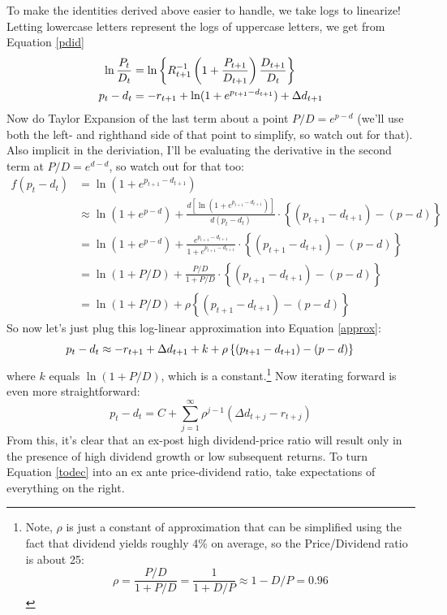 \documentclass[12pt]{article}
\theoremstyle{plain}
\theoremstyle{definition}
\theoremstyle{remark}
\begin{document}
To make the identities derived above easier to handle, we take
logs to linearize!
Letting lowercase letters represent the logs of uppercase letters, we
get from Equation \ref{pdid}
\begin{align}
    \ln \frac{P_t}{D_t} &=
	\ln \left\{ R^{-1}_{t+1} \left( 1 + \frac{P_{t+1}}{D_{t+1}}\right) \frac{D_{t+1}}{D_t}
	\right\} \notag \\
	p_t - d_t &= -r_{t+1} + \ln( 1 + e^{p_{t+1} - d_{t+1}})
	+ \Delta d_{t+1} \label{approx}
\end{align}
Now do Taylor Expansion of the last term about a point $P/D = e^{p-d}$
(we'll use both the left- and righthand side of that point to
simplify, so watch out for that).  Also implicit in the
deriviation, I'll be evaluating the derivative in the second
term at $P/D = e^{d-d}$, so watch out for that too:
\begin{align*}
    f(p_t - d_t) &= \ln(1 + e^{p_{t+1} - d_{t+1}}) \\
    &\approx \ln(1 + e^{p - d}) +
	\frac{d\left[\ln(1 + e^{p_{t+1} - d_{t+1}})\right]}{d(p_t - d_t)}
	\cdot \left\{ (p_{t+1}-d_{t+1}) - (p-d) \right\} \\
    &= \ln(1 + e^{p - d}) +
	\frac{e^{p_{t+1} - d_{t+1}}}{1+e^{p_{t+1} - d_{t+1}}}
	\cdot \left\{ (p_{t+1}-d_{t+1}) - (p-d) \right\} \\
     &= \ln(1 + {P}/{D}) +
	\frac{P/D}{1+P/D}
	\cdot \left\{ (p_{t+1}-d_{t+1}) - (p-d) \right\} \\
    &= \ln(1 + {P}/{D}) +
	\rho\left\{ (p_{t+1}-d_{t+1}) - (p-d) \right\}
\end{align*}
So now let's just plug this log-linear approximation into Equation
\ref{approx}:
\begin{equation}
    p_t - d_t \approx -r_{t+1}
	+ \Delta d_{t+1} +  k +
	\rho\left\{ (p_{t+1}-d_{t+1}) - (p-d) \right\} \\
\end{equation}
where $k$ equals $\ln(1+P/D)$, which is a constant.\footnote{Note,
$\rho$ is just a constant of approximation that can be simplified
using the fact that dividend yields roughly 4\% on average, so
the Price/Dividend ratio is about 25:
    \[ \rho = \frac{P/D}{1+P/D} = \frac{1}{1+ D/P} \approx 1 - D/P = 0.96 \]
}
Now iterating forward is even more straightforward:
\begin{equation}
    \label{todec}
    p_t - d_t = C +  \sum^\infty_{j=1} \rho^{j-1} (\Delta d_{t+j}
	- r_{t+j})
\end{equation}
From this, it's clear that an ex-post high dividend-price ratio will result
only in the presence of high dividend growth or low subsequent returns.
To turn Equation \ref{todec} into an ex ante price-dividend ratio,
take expectations of everything on the right.
\end{document}
